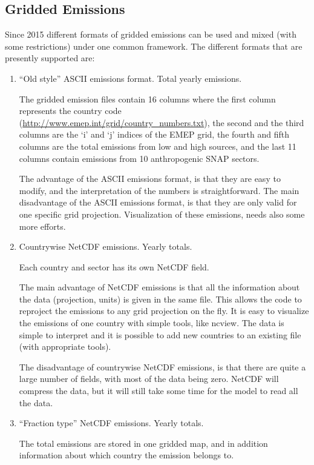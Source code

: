 \subsection{Gridded Emissions}

Since 2015 different formats of gridded emissions can be used and mixed (with some restrictions) under one common framework. The different formats that are presently supported are:
\begin{enumerate}
\item ``Old style'' ASCII emissions format. Total yearly emissions.

The gridded emission files contain 16 columns where the first column 
represents the country code
(\url{http://www.emep.int/grid/country_numbers.txt}), 
the second and the third columns are the `i' and `j' indices of the
EMEP grid, the fourth and fifth columns are the total emissions from
low and high sources, and the last 11 columns contain emissions from 
10 anthropogenic SNAP sectors.

The advantage of the ASCII emissions format, is that they are easy to modify, and the interpretation of the numbers is straightforward.
The main disadvantage of the ASCII emissions format, is that they are
only valid for one specific grid projection. Visualization of these
emissions, needs also some more efforts. 

\item Countrywise NetCDF emissions. Yearly totals.

Each country and sector has its own NetCDF field.

The main advantage of NetCDF emissions is that all the information
about the data (projection, units) is given in the same file. This
allows the code to reproject the emissions to any grid projection on
the fly. It is easy to visualize the emissions of one country with
simple tools, like ncview. The data is simple to interpret and it is
possible to add new countries to an existing file (with appropriate
tools). 

The disadvantage of countrywise NetCDF emissions, is that there are
quite a large number of fields, with most of the data being
zero. NetCDF will compress the data, but it will still take some time
for the model to read all the data. 
 
\item ``Fraction type'' NetCDF emissions. Yearly totals.

The total emissions are stored in one gridded map, and in addition
information about which country the emission belongs to. 


\end{enumerate}
